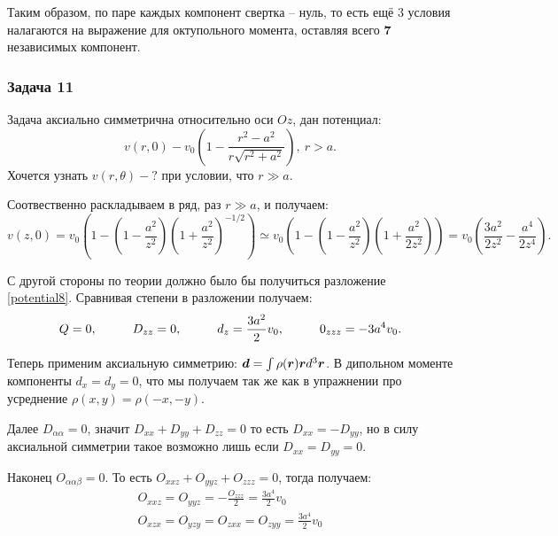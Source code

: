Таким образом, по паре каждых компонент свертка -- нуль, то есть ещё 3 условия налагаются на выражение для октупольного момента, оставляя всего \textbf{7} независимых компонент.

\subsubsection*{Задача 11}
Задача аксиально симметрична относительно оси $Oz$, дан потенциал:
\begin{equation*}
	v(r,0) - v_0 \left(1 - \frac{r^2 - a^2}{r \sqrt{r^2 + a^2}}\right), \ r>a.
\end{equation*}
Хочется узнать $v(r,\theta) - ?$ при условии, что $r \gg a$.

Соотвественно раскладываем в ряд, раз $r \gg a$, и получаем:
\begin{equation*}
	v(z,0) = v_0 \left(1 - \left(1 - \frac{a^2}{z^2}\right)\left(1 + \frac{a^2}{z^2}\right)^{-1/2}\right) 
	\simeq
	v_0 \left(1 - \left(1 - \frac{a^2}{z^2}\right)\left(1 + \frac{a^2}{2z^2}\right)\right) 
	=
	v_0 \left(\frac{3 a^2}{2 z^2} - \frac{a^4}{2 z^4}\right).
\end{equation*}

С другой стороны по теории должно было бы получиться разложение \eqref{potential8}. Сравнивая степени в разложении получаем:
\begin{equation*}
	Q = 0, \hspace{1 cm} D_{z z} = 0, \hspace{1 cm} d_z = \frac{3 a^2}{2}v_0,
	\hspace{1 cm} 0_{z z z} = - 3 a^4 v_0.
\end{equation*}

Теперь применим аксиальную симметрию: $\mbox{\boldmath $d$} = \int \rho(\mbox{\boldmath $r$}) \mbox{\boldmath $r$} d^3 \mbox{\boldmath $r$}$. В дипольном моменте компоненты $d_x = d_y = 0$, что мы получаем так же как в упражнении про усреднение $\rho(x, y) = \rho(-x,-y)$.

Далее $D_{\alpha\alpha} = 0$, значит $D_{xx} + D_{yy} + D_{zz} = 0$ то есть $D_{xx} = - D_{yy}$, но в силу аксиальной симметрии такое возможно лишь если $D_{xx} = D_{yy} = 0$.

Наконец $O_{\alpha\alpha\beta} = 0$. То есть $O_{xxz} + O_{yyz} + O_{zzz} = 0$, тогда получаем: 
\begin{gather*}
	O_{xxz} = O_{yyz} = - \frac{O_{zzz}}{2}	= \frac{3 a^4}{2}v_0\\
	O_{xzx} = O_{yzy} = O_{zxx} = O_{zyy} = \frac{3 a^4}{2}v_0
\end{gather*}

